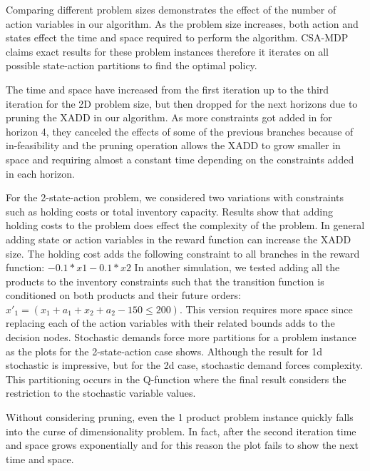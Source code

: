 Comparing different problem sizes demonstrates the effect of the number of action variables in our algorithm. As the problem size increases, both action and states effect the time and space required to perform the algorithm. CSA-MDP claims exact results for these problem instances therefore it iterates on all possible state-action partitions to find the optimal policy. 

The time and space have increased from the first iteration up to the third
iteration for the 2D problem size, but then dropped for the next horizons
due to pruning the XADD in our algorithm. As more constraints got added in
for horizon 4, they canceled the effects of some of the previous branches
because of in-feasibility and the pruning operation allows the XADD to grow
smaller in space and requiring almost a constant time depending on the
constraints added in each horizon.

For the 2-state-action problem, we considered two variations with constraints such as holding costs or total inventory capacity. Results show that adding holding costs to the problem does effect the complexity of the problem. In general adding state or action variables in the reward function can increase the XADD size. The holding cost adds the following constraint to all branches in the reward function: 
$ -0.1*x1 -0.1*x2 $
In another simulation, we tested adding all the products to the inventory constraints such that the transition function is conditioned on both products and their future orders:  $x'_1 = (x_1 + a_1 + x_2 +a_2 - 150 \leq 200) $. This version requires more space since replacing each of the action variables with their related bounds adds to the decision nodes.
Stochastic demands force more partitions for a problem instance as the plots for the 2-state-action case shows. Although the result for 1d stochastic is impressive, but for the 2d case, stochastic demand forces complexity. This partitioning occurs in the Q-function where the final result considers the restriction to the stochastic variable values. 

Without considering pruning, even the 1 product problem instance quickly falls into the curse of dimensionality problem. In fact, after the second iteration time and space grows exponentially and for this reason the plot fails to show the next time and
space.


